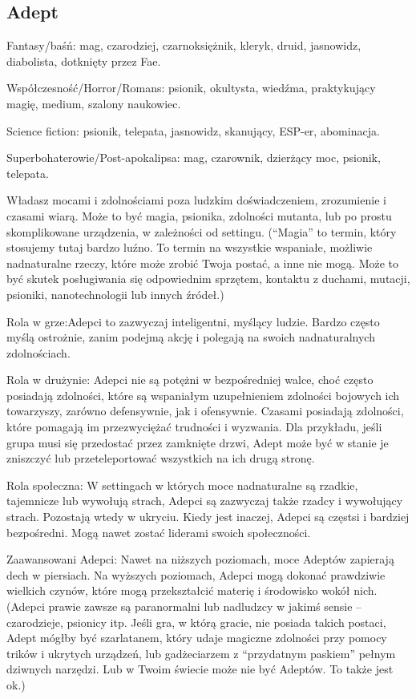 \cleardoublepage

\subsection{Adept}

Fantasy/baśń: mag, czarodziej, czarnoksiężnik, kleryk, druid, jasnowidz, diabolista, dotknięty przez Fae.

Współczesność/Horror/Romans: psionik, okultysta, wiedźma, praktykujący magię, medium, szalony naukowiec.

Science fiction: psionik, telepata, jasnowidz, skanujący, ESP-er, abominacja.

Superbohaterowie/Post-apokalipsa: mag, czarownik, dzierżący moc, psionik, telepata.

Władasz mocami i zdolnościami poza ludzkim doświadczeniem, zrozumienie i czasami wiarą. Może to być magia, psionika, zdolności mutanta, lub po prostu skomplikowane urządzenia, w zależności od settingu. (“Magia” to termin, który stosujemy tutaj bardzo luźno. To termin na wszystkie wspaniałe, możliwie nadnaturalne rzeczy, które może zrobić Twoja postać, a inne nie mogą. Może to być skutek posługiwania się odpowiednim sprzętem, kontaktu z duchami, mutacji, psioniki, nanotechnologii lub innych źródeł.)

Rola w grze:Adepci to zazwyczaj inteligentni, myślący ludzie. Bardzo często myślą ostrożnie, zanim podejmą akcję i polegają na swoich nadnaturalnych zdolnościach.

Rola w drużynie: Adepci nie są potężni w bezpośredniej walce, choć często posiadają zdolności, które są wspaniałym uzupełnieniem zdolności bojowych ich towarzyszy, zarówno defensywnie, jak i ofensywnie. Czasami posiadają zdolności, które pomagają im przezwyciężać trudności i wyzwania. Dla przykładu, jeśli grupa musi się przedostać przez zamknięte drzwi, Adept może być w stanie je zniszczyć lub przeteleportować wszystkich na ich drugą stronę.

Rola społeczna: W settingach w których moce nadnaturalne są rzadkie, tajemnicze lub wywołują strach, Adepci są zazwyczaj także rzadcy i wywołujący strach. Pozostają wtedy w ukryciu. Kiedy jest inaczej, Adepci są częstsi i bardziej bezpośredni. Mogą nawet zostać liderami swoich społeczności.

Zaawansowani Adepci: Nawet na niższych poziomach, moce Adeptów zapierają dech w piersiach. Na wyższych poziomach, Adepci mogą dokonać prawdziwie wielkich czynów, które mogą przekształcić materię i środowisko wokół nich.
(Adepci prawie zawsze są paranormalni lub nadludzcy w jakimś sensie – czarodzieje, psionicy itp. Jeśli gra, w którą gracie, nie posiada takich postaci, Adept mógłby być szarlatanem, który udaje magiczne zdolności przy pomocy trików i ukrytych urządzeń, lub gadżeciarzem z “przydatnym paskiem” pełnym dziwnych narzędzi. Lub w Twoim świecie może nie być Adeptów. To także jest ok.)

